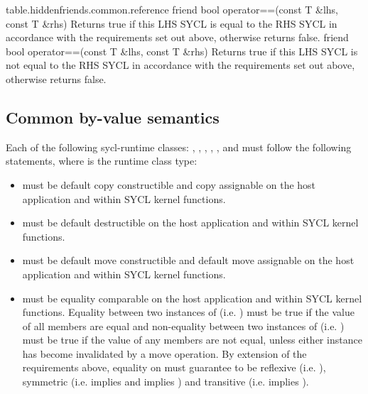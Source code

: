 {table.hiddenfriends.common.reference}
   \addRow
   {friend bool operator==(const T \&lhs, const T \&rhs)}
   {
     Returns true if this LHS SYCL  is equal to the RHS SYCL  in accordance with the requirements set out above, otherwise returns false.
   }
   \addRow
   {friend bool operator==(const T \&lhs, const T \&rhs)}
   {
     Returns true if this LHS SYCL  is not equal to the RHS SYCL  in accordance with the requirements set out above, otherwise returns false.
   }
\completeTable

\subsection{Common by-value semantics}
\label{sec:byval-semantics}

Each of the following \gls{sycl-runtime} classes: , , , , ,  and  must follow the following statements, where  is the runtime class type:

\begin{itemize}

\item {} must be default copy constructible and copy assignable on the host application and within SYCL kernel functions.

\item {} must be default destructible on the host application and within SYCL kernel functions.

\item {} must be default move constructible and default move assignable on the host application and within SYCL kernel functions.

\item {} must be equality comparable on the host application and within SYCL kernel functions. Equality between two instances of  (i.e. ) must be true if the value of all members are equal and non-equality between two instances of  (i.e. ) must be true if the value of any members are not equal, unless either instance has become invalidated by a move operation. By extension of the requirements above, equality on  must guarantee to be reflexive (i.e. ), symmetric (i.e.  implies  and  implies ) and transitive (i.e.  implies ).

\end{itemize}

